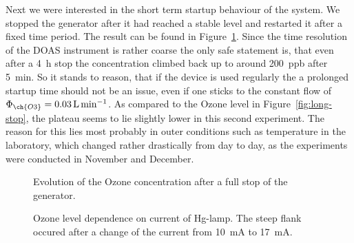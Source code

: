 Next we were interested in the short term startup behaviour of the
system. We stopped the generator after it had reached a stable level
and restarted it after a fixed time period. The result can be found in
Figure~\ref{fig:multiple-stop}. Since the time resolution of the DOAS
instrument is rather coarse the only safe statement is, that even
after a \SI{4}{\hour} stop the concentration climbed back up to around
\SI{200}{ppb} after \SI{5}{\minute}. So it stands to reason, that if
the device is used regularly the a prolonged startup time should not
be an issue, even if one sticks to the constant flow of
$\Phi_{\ch{O3}} = \SI{0.03}{\liter\per\minute}$. As compared to the
Ozone level in Figure~\ref{fig:long-stop}, the plateau seems to lie
slightly lower in this second experiment. The reason for this lies
most probably in outer conditions such as temperature in the
laboratory, which changed rather drastically from day to day, as the
experiments were conducted in November and December.

\begin{figure}[htbp]
  \centering
  \caption{Evolution of the Ozone concentration after a full stop of the
    generator.}
  \label{fig:multiple-stop}
\end{figure}

\begin{figure}[htbp]
  \centering
  \caption{Ozone level dependence on current of Hg-lamp. The steep
    flank occured after a change of the current from
    \SI{10}{\milli\ampere} to \SI{17}{\milli\ampere}.}
  \label{fig:lamp}
\end{figure}

